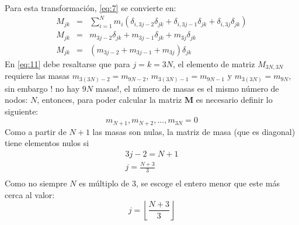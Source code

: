 Para esta transformaci\'{o}n, \eqref{eq:7} se convierte en:
\begin{eqnarray}\label{eq:11}
M_{jk}&=&\sum_{i=1}^{N} m_{i}\left( \delta_{i,3j-2}\delta_{jk}+\delta_{i,3j-1}\delta_{jk}+  \delta_{i,3j}\delta_{jk}\right)\nonumber \\
M_{jk}&=&m_{3j-2}\delta_{jk}+m_{3j-1}\delta_{jk}+m_{3j}\delta_{jk} \nonumber \\
M_{jk}&=&\left( m_{3j-2}+m_{3j-1}+m_{3j} \right) \delta_{jk}
\end{eqnarray}
En \eqref{eq:11} debe resaltarse que para $j=k=3N$, el elemento de matriz $M_{3N,3N}$ requiere las masas $m_{3(3N)-2}=m_{9N-2}$, $m_{3(3N)-1}=m_{9N-1}$ y $m_{3(3N)}=m_{9N}$, sin embargo ! no hay $9N$ masas!, el n\'{u}mero de masas es el mismo n\'{u}mero de nodos: $N$, entonces, para poder calcular la matriz $\mathbf{M}$ es necesario definir lo siguiente:
\begin{equation}\label{eq:12}
m_{N+1},m_{N+2},...,m_{3N}=0
\end{equation}
Como a partir de $N+1$ las masas son nulas, la matriz de masa (que es diagonal) tiene elementos nulos si  
\begin{eqnarray*}
3j-2=N+1\\
j=\frac{N+3}{3} \\
\end{eqnarray*}
Como no siempre $N$ es m\'{u}ltiplo de 3, se escoge el entero menor que este m\'{a}s cerca al valor:
\begin{equation}\label{eq:13}
j=\left \lfloor\frac{N+3}{3}\right \rfloor
\end{equation}
